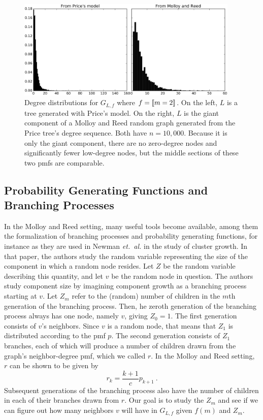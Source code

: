 \documentclass[12pt]{article}
\DeclarePairedDelimiter\iverson{\llbracket}{\rrbracket}%
\begin{document}
\begin{figure}[t]
\begin{center}
\includegraphics[width=300pt]{4}
\caption{Degree distributions for $G_{L,f}$ where $f=\iverson{m=2}$. On the left,
$L$ is a tree generated with Price's model. On the right, $L$ is the giant
component of a Molloy and Reed random graph generated from the Price tree's
degree sequence. Both have $n=10,000$. Because it is only the giant component, there are no zero-degree
nodes and significantly fewer low-degree nodes, but the middle sections of these
two pmfs are comparable.}
\end{center}
\end{figure}


\subsection{\textbf{\textsf{Probability Generating Functions and Branching Processes}}}

In the Molloy and Reed setting, many useful tools become available, among them the
formalization of branching processes and probability generating functions, for
instance as they are used in Newman \textit{et.\ al.} \cite{newman01} in the study
of cluster growth. In that paper, the authors study the random variable representing the
size of the component in which a random node resides. Let $Z$ be the random variable
describing this quantity, and let $v$ be the random node in question. The authors
study component size by imagining component growth as a branching process starting at $v$.
Let $Z_m$ refer to the (random) number of children in the $m$th generation of the branching process.
Then, he zeroth generation of the branching process always has one node, namely $v$, giving
$Z_0 = 1$. The first generation consists of $v$'s neighbors. Since $v$ is a random node, that means
that $Z_1$ is distributed according to the pmf $p$. The second generation consists of $Z_1$ branches,
each of which will produce a number of children drawn from the graph's neighbor-degree pmf,
which we called $r$. In the Molloy and Reed setting, $r$ can be shown to be given by
\[ r_k = \frac{k+1}{c}p_{k+1}\ . \]
Subsequent generations of the branching process also have the number of children in each
of their branches drawn from $r$. Our goal is to study the $Z_m$ and see if we can
figure out how many neighbors $v$ will have in $G_{L,f}$ given $f(m)$ and $Z_m$.\par
\end{document}
